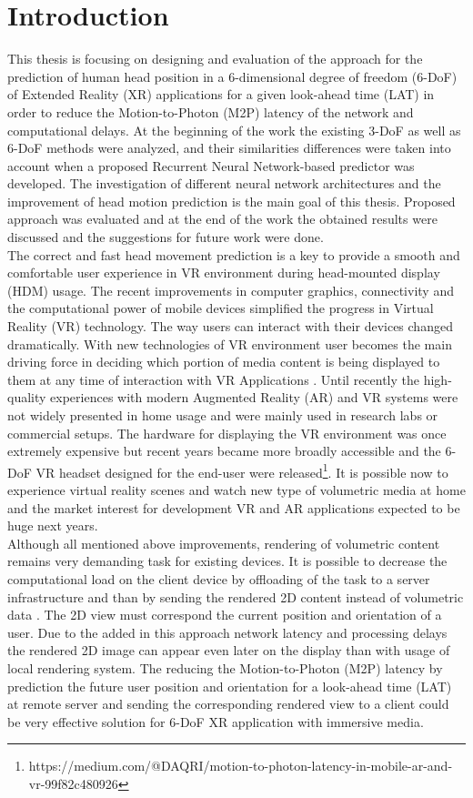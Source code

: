 \chapter{Introduction}
\label{sec:intro}
This thesis is focusing on designing and evaluation of the approach for the prediction of human head position in a 6-dimensional degree of freedom (6-DoF) of Extended Reality (XR) applications for a given look-ahead time (LAT) in order to reduce the Motion-to-Photon (M2P) latency of the network and computational delays. At the beginning of the work the existing 3-DoF as well as 6-DoF methods were analyzed, and their similarities differences were taken into account when a proposed Recurrent Neural Network-based predictor was developed. The investigation of different neural network architectures and the improvement of head motion prediction is the main goal of this thesis. Proposed approach was evaluated and at the end of the work the obtained results were discussed and the suggestions for future work were done.\\
The correct and fast head movement prediction is a key to provide a smooth and comfortable user experience in VR environment during head-mounted display (HDM) usage. The recent improvements in computer graphics, connectivity and the computational power of mobile devices simplified the progress in Virtual Reality (VR) technology. The way users can interact with their devices changed dramatically. With new technologies of VR environment user becomes the main driving force in deciding which portion of media content is being displayed to them at any time of interaction with VR Applications \cite{new_challenge}. Until recently the high-quality experiences with modern Augmented Reality (AR) and VR systems were not widely presented in home usage and were mainly used in research labs or commercial setups. The hardware for displaying the VR environment was once extremely expensive but recent years became more broadly accessible and the 6-DoF VR headset designed for the end-user were released\footnote{https://medium.com/@DAQRI/motion-to-photon-latency-in-mobile-ar-and-vr-99f82c480926}. It is possible now to experience virtual reality scenes and watch new type of volumetric media at home and the market interest for development VR and AR applications expected to be huge next years.\\
Although all mentioned above improvements, rendering of volumetric content remains very demanding task for existing devices. It is possible to decrease the computational load on the client device by offloading of the task to a server infrastructure and than by sending the rendered 2D content instead of volumetric data \cite{serhan_cloud_streaming}. The 2D view must correspond the current position and orientation of a user. Due to the added in this approach network latency and processing delays the rendered 2D image can appear even later on the display than with usage of local rendering system. The reducing the Motion-to-Photon (M2P) latency by prediction the future user position and orientation for a look-ahead time (LAT) at remote server and sending the corresponding rendered view to a client could be very effective solution for 6-DoF XR application with immersive media. 


